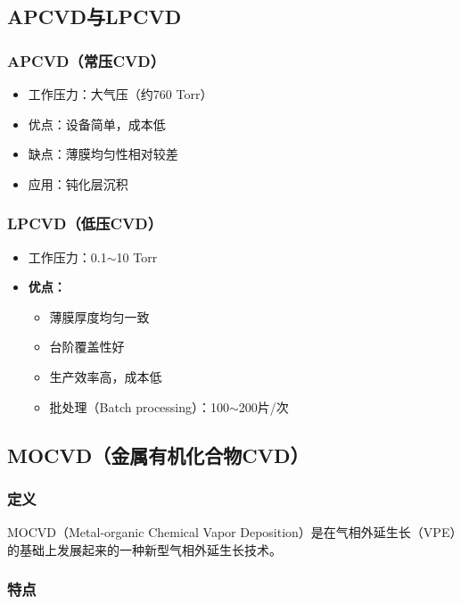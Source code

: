 \documentclass[UTF8,12pt,a4paper]{ctexart}
\begin{document}
\subsection{APCVD与LPCVD}

\subsubsection{APCVD（常压CVD）}

\begin{itemize}
    \item 工作压力：大气压（约760 Torr）
    \item 优点：设备简单，成本低
    \item 缺点：薄膜均匀性相对较差
    \item 应用：钝化层沉积
\end{itemize}

\subsubsection{LPCVD（低压CVD）}

\begin{itemize}
    \item 工作压力：0.1$\sim$10 Torr
    \item \textbf{优点：}
    \begin{itemize}
        \item 薄膜厚度均匀一致
        \item 台阶覆盖性好
        \item 生产效率高，成本低
        \item 批处理（Batch processing）：100$\sim$200片/次
    \end{itemize}
\end{itemize}

\subsection{MOCVD（金属有机化合物CVD）}

\subsubsection{定义}

MOCVD（Metal-organic Chemical Vapor Deposition）是在气相外延生长（VPE）的基础上发展起来的一种新型气相外延生长技术。

\subsubsection{特点}
\end{document}
